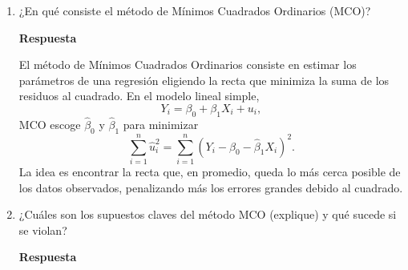 \documentclass[letterpaper,11pt]{article}
\begin{document}
\begin{enumerate}
Queremos analizar la diferencia de medias $\mu_{campo}-\mu_{ciudad}$. La diferencia muestral es
\[
\bar{X}_{campo}-\bar{X}_{ciudad}=3,8-3,5=0,3.
\]
El error estándar es
\[
\sqrt{\frac{0,6^2}{240}+\frac{0,8^2}{300}}
=\sqrt{0,0015+0,00213}
=0,0603.
\]
El intervalo de confianza al 95\% es
\[
0,3\pm 1,96(0,0603)
=0,3\pm 0,1182.
\]
Por lo tanto,
\[
\boxed{[0,1818,\;0,4182].}
\]
Como el intervalo no contiene al cero, existe evidencia al 95\% de confianza para concluir que el peso promedio al nacer difiere entre ambos grupos. Además, como el intervalo es positivo, el peso promedio de los bebés cuyas madres viven en el campo es mayor que el de los bebés cuyas madres viven en la ciudad.

\item ¿En qué consiste el método de Mínimos Cuadrados Ordinarios (MCO)?

\textbf{Respuesta}

El método de Mínimos Cuadrados Ordinarios consiste en estimar los parámetros de una regresión eligiendo la recta que minimiza la suma de los residuos al cuadrado. En el modelo lineal simple,
\[
Y_i=\beta_0+\beta_1X_i+u_i,
\]
MCO escoge $\hat{\beta}_0$ y $\hat{\beta}_1$ para minimizar
\[
\sum_{i=1}^{n}\hat{u}_i^2
=\sum_{i=1}^{n}(Y_i-\hat{\beta}_0-\hat{\beta}_1X_i)^2.
\]
La idea es encontrar la recta que, en promedio, queda lo más cerca posible de los datos observados, penalizando más los errores grandes debido al cuadrado.


\item ¿Cuáles son los supuestos claves del método MCO (explique) y qué sucede si se violan?

\textbf{Respuesta}


\end{enumerate}
\end{document}
